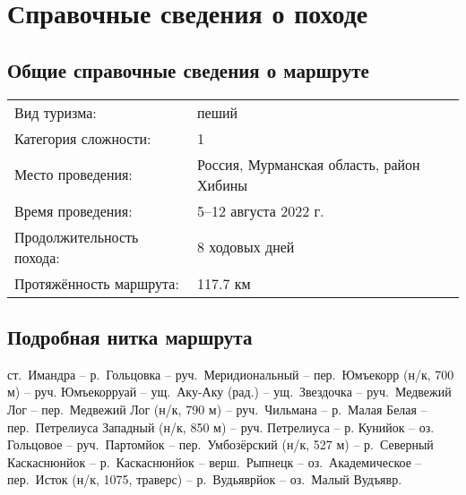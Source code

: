 \newpage
\section{Справочные сведения о походе}
\subsection{Общие справочные сведения о маршруте}
\begin{tabular}{ l l }
    Вид туризма: & пеший\\
    Категория сложности: & 1\\
    Место проведения: & Россия, Мурманская область, район Хибины\\
    Время проведения: & 5--12 августа 2022 г.\\
    Продолжительность похода: & 8 ходовых дней\\
    Протяжённость маршрута: & 117.7 км\\
\end{tabular}

\subsection{Подробная нитка маршрута}
ст.~Имандра -- р.~Гольцовка -- руч.~Меридиональный -- пер.~Юмъекорр (н/к, 700 м) -- руч. Юмъекорруай --
ущ.~Аку-Аку (рад.) -- ущ.~Звездочка -- руч.~Медвежий Лог -- пер.~Медвежий Лог (н/к, 790 м) -- руч.~Чильмана --
р.~Малая Белая -- пер.~Петрелиуса Западный (н/к, 850 м) -- руч. Петрелиуса -- р. Кунийок -- оз. Гольцовое --
руч.~Партомйок -- пер.~Умбозёрский (н/к, 527 м) -- р.~Северный Каскаснюнйок -- р.~Каскаснюнйок -- верш.~Рыпнецк --
оз.~Академическое -- пер.~Исток (н/к, 1075, траверс) -- р.~Вудьяврйок -- оз.~Малый Вудъявр.


